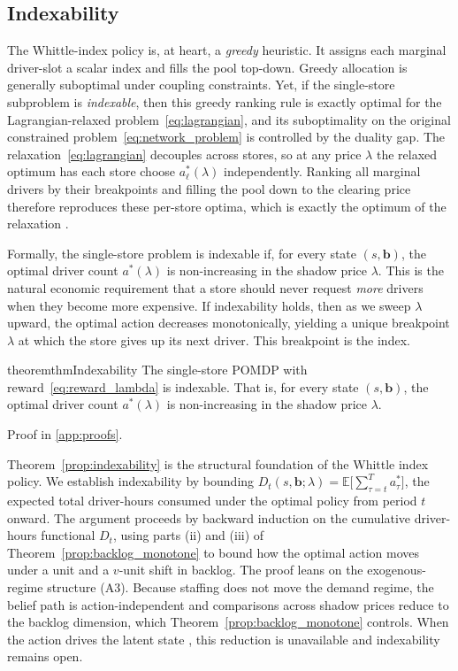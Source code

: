 \documentclass[preprint,11pt,authoryear]{elsarticle}
\newcommand{\bvec}[1]{\mathbf{#1}}
\theoremstyle{remark}
\begin{document}
\subsection{Indexability}
\label{sec:indexability}

The Whittle-index policy \citep{whittle1988restless} is, at heart, a \emph{greedy} heuristic. It assigns each marginal driver-slot a scalar index and fills the pool top-down. Greedy allocation is generally suboptimal under coupling constraints. Yet, if the single-store subproblem is \emph{indexable}, then this greedy ranking rule is exactly optimal for the Lagrangian-relaxed problem~\eqref{eq:lagrangian}, and its suboptimality on the original constrained problem~\eqref{eq:network_problem} is controlled by the duality gap. The relaxation~\eqref{eq:lagrangian} decouples across stores, so at any price $\lambda$ the relaxed optimum has each store choose $a^*_\ell(\lambda)$ independently. Ranking all marginal drivers by their breakpoints and filling the pool down to the clearing price therefore reproduces these per-store optima, which is exactly the optimum of the relaxation \citep{whittle1988restless, weber1990index}.

Formally, the single-store problem is indexable if, for every state $(s, \bvec{b})$, the optimal driver count $a^*(\lambda)$ is non-increasing in the shadow price $\lambda$. This is the natural economic requirement that a store should never request \emph{more} drivers when they become more expensive. If indexability holds, then as we sweep $\lambda$ upward, the optimal action decreases monotonically, yielding a unique breakpoint $\lambda$ at which the store gives up its next driver. This breakpoint is the index.

\begin{restatable}{theorem}{thmIndexability}
\label{prop:indexability}
The single-store POMDP with reward~\eqref{eq:reward_lambda} is indexable. That is, for every state $(s, \bvec{b})$, the optimal driver count $a^*(\lambda)$ is non-increasing in the shadow price $\lambda$.
\end{restatable}

Proof in \ref{app:proofs}.


Theorem~\ref{prop:indexability} is the structural foundation of the Whittle index policy. We establish indexability by bounding $D_t(s, \bvec{b}; \lambda) = \mathbb{E}\bigl[\sum_{\tau=t}^{T} a^*_\tau\bigr]$, the expected total driver-hours consumed under the optimal policy from period $t$ onward. The argument proceeds by backward induction on the cumulative driver-hours functional $D_t$, using parts (ii) and (iii) of Theorem~\ref{prop:backlog_monotone} to bound how the optimal action moves under a unit and a $v$-unit shift in backlog. The proof leans on the exogenous-regime structure (A3). Because staffing does not move the demand regime, the belief path is action-independent and comparisons across shadow prices reduce to the backlog dimension, which  Theorem~\ref{prop:backlog_monotone} controls. When the action drives the latent state \citep{MeshramKaza2025}, this reduction is unavailable and indexability remains open.
\end{document}
